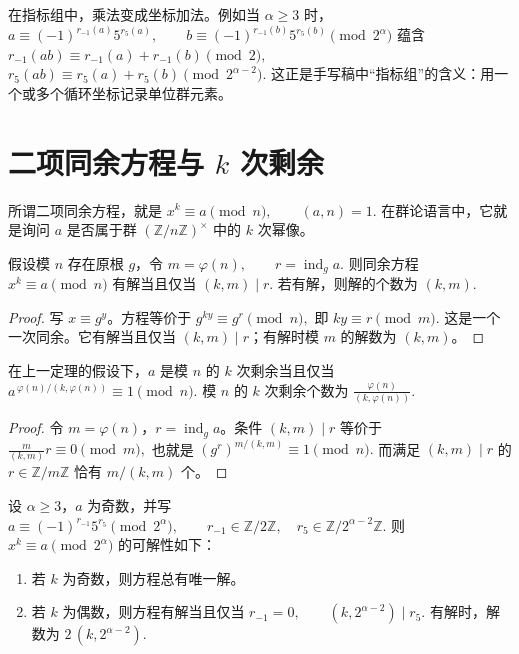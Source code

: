 \documentclass[oneside]{AJbook}
\newcommand{\Z}{\mathbb Z}
\newcommand{\U}[1]{(\Z/#1\Z)^\times}
\newcommand{\Cyc}[1]{\Z/#1\Z}
\begin{document}
在指标组中，乘法变成坐标加法。例如当 $\alpha\ge3$ 时，
\(
  a\equiv (-1)^{r_{-1}(a)}5^{r_5(a)},\qquad
  b\equiv (-1)^{r_{-1}(b)}5^{r_5(b)}
  \pmod {2^\alpha}
\)
蕴含
\(
  r_{-1}(ab)\equiv r_{-1}(a)+r_{-1}(b)\pmod 2,
\)
\(
  r_5(ab)\equiv r_5(a)+r_5(b)\pmod {2^{\alpha-2}}.
\)
这正是手写稿中“指标组”的含义：用一个或多个循环坐标记录单位群元素。

\section{二项同余方程与 $k$ 次剩余}

所谓二项同余方程，就是
\(
  x^k\equiv a\pmod n,\qquad (a,n)=1.
\)
在群论语言中，它就是询问 $a$ 是否属于群 $\U n$ 中的 $k$ 次幂像。

\begin{theorem}[循环情形的判别]
假设模 $n$ 存在原根 $g$，令
\(
  m=\varphi(n),\qquad r=\operatorname{ind}_g a.
\)
则同余方程
\(
  x^k\equiv a\pmod n
\)
有解当且仅当
\(
  (k,m)\mid r.
\)
若有解，则解的个数为
\(
  (k,m).
\)
\end{theorem}

\begin{proof}
写 $x\equiv g^y$。方程等价于
\(
  g^{ky}\equiv g^r\pmod n,
\)
即
\(
  ky\equiv r\pmod m.
\)
这是一个一次同余。它有解当且仅当 $(k,m)\mid r$；有解时模 $m$ 的解数为 $(k,m)$。
\end{proof}

\begin{corollary}[循环情形的指数判别]
在上一定理的假设下，$a$ 是模 $n$ 的 $k$ 次剩余当且仅当
\(
  a^{\,\varphi(n)/(k,\varphi(n))}\equiv 1\pmod n.
\)
模 $n$ 的 $k$ 次剩余个数为
\(
  \frac{\varphi(n)}{(k,\varphi(n))}.
\)
\end{corollary}

\begin{proof}
令 $m=\varphi(n)$，$r=\operatorname{ind}_g a$。条件 $(k,m)\mid r$ 等价于
\(
  \frac{m}{(k,m)}r\equiv 0\pmod m,
\)
也就是
\(
  (g^r)^{m/(k,m)}\equiv 1\pmod n.
\)
而满足 $(k,m)\mid r$ 的 $r\in\Z/m\Z$ 恰有 $m/(k,m)$ 个。
\end{proof}

\begin{theorem}
设 $\alpha\ge3$，$a$ 为奇数，并写
\(
  a\equiv (-1)^{r_{-1}}5^{r_5}\pmod {2^\alpha},
  \qquad
  r_{-1}\in\Cyc2,\quad r_5\in\Cyc{2^{\alpha-2}}.
\)
则
\(
  x^k\equiv a\pmod {2^\alpha}
\)
的可解性如下：

\begin{enumerate}[label=(\roman*),leftmargin=2em]
  \item 若 $k$ 为奇数，则方程总有唯一解。
  \item 若 $k$ 为偶数，则方程有解当且仅当
  \(
    r_{-1}=0,\qquad
    (k,2^{\alpha-2})\mid r_5.
  \)
  有解时，解数为
  \(
    2\,(k,2^{\alpha-2}).
  \)
\end{enumerate}
\end{theorem}
\end{document}
